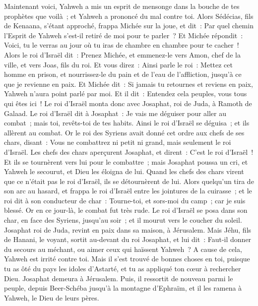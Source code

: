 \begin{multicols}{2}
Maintenant voici, Yahweh a mis un esprit de mensonge dans la bouche de tes prophètes que voilà~; et Yahweh a prononcé du mal contre toi.
Alors Sédécias, fils de Kenaana, s'étant approché, frappa Michée sur la joue, et dit~: Par quel chemin l'Esprit de Yahweh s'est-il retiré de moi pour te parler~?
Et Michée répondit~: Voici, tu le verras au jour où tu iras de chambre en chambre pour te cacher~!
Alors le roi d'Israël dit~: Prenez Michée, et emmenez-le vers Amon, chef de la ville, et vers Joas, fils du roi.
Et vous direz~: Ainsi parle le roi~: Mettez cet homme en prison, et nourrissez-le du pain et de l'eau de l'affliction, jusqu'à ce que je revienne en paix.
Et Michée dit~: Si jamais tu retournes et reviens en paix, Yahweh n'aura point parlé par moi. Et il dit~: Entendez cela peuples, vous tous qui êtes ici~!
Le roi d'Israël monta donc avec Josaphat, roi de Juda, à Ramoth de Galaad.
Le roi d'Israël dit à Josaphat~: Je vais me déguiser pour aller au combat~; mais toi, revêts-toi de tes habits. Ainsi le roi d'Israël se déguisa~; et ils allèrent au combat.
Or le roi des Syriens avait donné cet ordre aux chefs de ses chars, disant~: Vous ne combattrez ni petit ni grand, mais seulement le roi d'Israël.
Les chefs des chars aperçurent Josaphat, et dirent~: C'est le roi d'Israël~! Et ils se tournèrent vers lui pour le combattre~; mais Josaphat poussa un cri, et Yahweh le secourut, et Dieu les éloigna de lui.
Quand les chefs des chars virent que ce n'était pas le roi d'Israël, ils se détournèrent de lui.
Alors quelqu'un tira de son arc au hasard, et frappa le roi d'Israël entre les jointures de la cuirasse~; et le roi dit à son conducteur de char~: Tourne-toi, et sors-moi du camp~; car je suis blessé.
Or en ce jour-là, le combat fut très rude. Le roi d'Israël se posa dans son char, en face des Syriens, jusqu'au soir~; et il mourut vers le coucher du soleil.
\VerseOne{}Josaphat roi de Juda, revint en paix dans sa maison, à Jérusalem.
Mais Jéhu, fils de Hanani, le voyant, sortit au-devant du roi Josaphat, et lui dit~: Faut-il donner du secours au méchant, ou aimer ceux qui haïssent Yahweh~? A cause de cela, Yahweh est irrité contre toi.
Mais il s'est trouvé de bonnes choses en toi, puisque tu as ôté du pays les idoles d'Astarté, et tu as appliqué ton cœur à rechercher Dieu.
Josaphat demeura à Jérusalem. Puis, il ressortit de nouveau parmi le peuple, depuis Beer-Schéba jusqu'à la montagne d'Ephraïm, et il les ramena à Yahweh, le Dieu de leurs pères.

\end{multicols}
